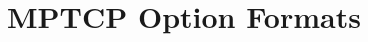 \documentclass[12pt, a4paper, oneside]{article} %
\begin{document}
%
%
%


%
\appendix %
\section{MPTCP Option Formats} \label{mp opt format}

              

%
%
%
%
%
%
%
\end{document}
